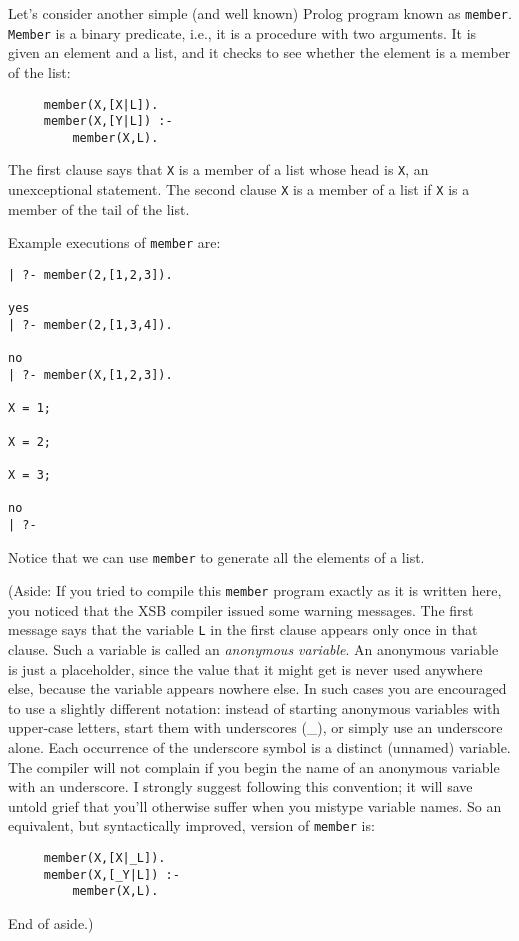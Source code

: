 Let's consider another simple (and well known) Prolog program known as
\verb|member|.  \verb|Member| is a binary predicate, i.e., it is a
procedure with two arguments.  It is given an element and a list, and
it checks to see whether the element is a member of the list:
\begin{verbatim}
     member(X,[X|L]).
     member(X,[Y|L]) :-
         member(X,L).
\end{verbatim}
The first clause says that \verb|X| is a member of a list whose head
is \verb|X|, an unexceptional statement.  The second clause \verb|X|
is a member of a list if \verb|X| is a member of the tail of the list.

Example executions of \verb|member| are:
\begin{verbatim}
| ?- member(2,[1,2,3]).

yes
| ?- member(2,[1,3,4]).

no
| ?- member(X,[1,2,3]).

X = 1;

X = 2;

X = 3;

no
| ?- 
\end{verbatim}
Notice that we can use \verb|member| to generate all the elements of a
list.

(Aside: If you tried to compile this \verb|member| program exactly as
it is written here, you noticed that the XSB compiler issued some
warning messages.  The first message says that the variable \verb|L|
in the first clause appears only once in that clause.  Such a variable
is called an {\em anonymous variable}.  An anonymous variable is just
a placeholder, since the value that it might get is never used
anywhere else, because the variable appears nowhere else.  In such
cases you are encouraged to use a slightly different notation: instead
of starting anonymous variables with upper-case letters, start them
with underscores (\_), or simply use an underscore alone.  Each
occurrence of the underscore symbol is a distinct (unnamed) variable.
The compiler will not complain if you begin the name of an anonymous
variable with an underscore.  I strongly suggest following this
convention; it will save untold grief that you'll otherwise suffer
when you mistype variable names.  So an equivalent, but syntactically
improved, version of \verb|member| is:
\begin{verbatim}
     member(X,[X|_L]).
     member(X,[_Y|L]) :-
         member(X,L).
\end{verbatim}
End of aside.)

